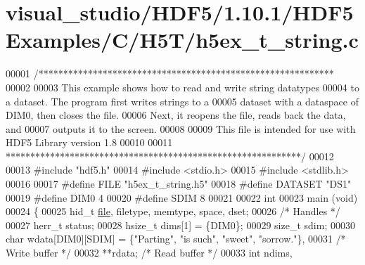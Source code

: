 \hypertarget{visual__studio_2_h_d_f5_21_810_81_2_h_d_f5_examples_2_c_2_h5_t_2h5ex__t__string_8c_source}{}\section{visual\+\_\+studio/\+H\+D\+F5/1.10.1/\+H\+D\+F5\+Examples/\+C/\+H5\+T/h5ex\+\_\+t\+\_\+string.c}
\label{visual__studio_2_h_d_f5_21_810_81_2_h_d_f5_examples_2_c_2_h5_t_2h5ex__t__string_8c_source}

\begin{DoxyCode}
00001 \textcolor{comment}{/************************************************************}
00002 \textcolor{comment}{}
00003 \textcolor{comment}{  This example shows how to read and write string datatypes}
00004 \textcolor{comment}{  to a dataset.  The program first writes strings to a}
00005 \textcolor{comment}{  dataset with a dataspace of DIM0, then closes the file.}
00006 \textcolor{comment}{  Next, it reopens the file, reads back the data, and}
00007 \textcolor{comment}{  outputs it to the screen.}
00008 \textcolor{comment}{}
00009 \textcolor{comment}{  This file is intended for use with HDF5 Library version 1.8}
00010 \textcolor{comment}{}
00011 \textcolor{comment}{ ************************************************************/}
00012 
00013 \textcolor{preprocessor}{#include "hdf5.h"}
00014 \textcolor{preprocessor}{#include <stdio.h>}
00015 \textcolor{preprocessor}{#include <stdlib.h>}
00016 
00017 \textcolor{preprocessor}{#define FILE            "h5ex\_t\_string.h5"}
00018 \textcolor{preprocessor}{#define DATASET         "DS1"}
00019 \textcolor{preprocessor}{#define DIM0            4}
00020 \textcolor{preprocessor}{#define SDIM            8}
00021 
00022 \textcolor{keywordtype}{int}
00023 main (\textcolor{keywordtype}{void})
00024 \{
00025     hid\_t       \hyperlink{structfile}{file}, filetype, memtype, space, dset;
00026                                             \textcolor{comment}{/* Handles */}
00027     herr\_t      status;
00028     hsize\_t     dims[1] = \{DIM0\};
00029     \textcolor{keywordtype}{size\_t}      sdim;
00030     \textcolor{keywordtype}{char}        wdata[DIM0][SDIM] = \{\textcolor{stringliteral}{"Parting"}, \textcolor{stringliteral}{"is such"}, \textcolor{stringliteral}{"sweet"}, \textcolor{stringliteral}{"sorrow."}\},
00031                                             \textcolor{comment}{/* Write buffer */}
00032                 **rdata;                    \textcolor{comment}{/* Read buffer */}
00033     \textcolor{keywordtype}{int}         ndims,

\end{DoxyCode}
